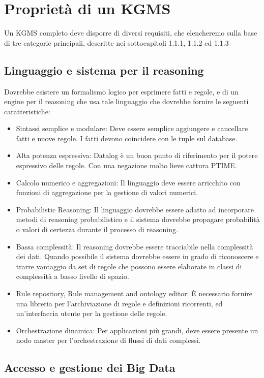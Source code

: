 \section{Proprietà di un KGMS}

Un KGMS completo deve disporre di diversi requisiti, che elencheremo sulla base di tre categorie principali, descritte nei sottocapitoli 1.1.1, 1.1.2 ed 1.1.3

\subsection{Linguaggio e sistema per il reasoning}

Dovrebbe esistere un formalismo logico per esprimere fatti e regole, e di un engine per il reasoning che usa tale linguaggio che dovrebbe fornire le seguenti caratteristiche:
\begin{itemize}
	\item Sintassi semplice e modulare: Deve essere semplice aggiungere e cancellare fatti e nuove regole. I fatti devono coincidere con le tuple sul database.
	\item Alta potenza espressiva: Datalog è un buon punto di riferimento per il potere espressivo delle regole. Con una negazione molto lieve cattura PTIME.
	\item Calcolo numerico e aggregazioni: Il linguaggio deve essere arricchito con funzioni di aggregazione per la gestione di valori numerici.
	\item Probabilistic Reasoning: Il linguaggio dovrebbe essere adatto ad incorporare metodi di reasoning probabilistico e il sistema dovrebbe propagare probabilità o valori di certezza durante il processo di reasoning.
	\item Bassa complessità: Il reasoning dovrebbe essere tracciabile nella complessità dei dati. Quando possibile il sistema dovrebbe essere in grado di riconoscere e trarre vantaggio da set di regole che possono essere elaborate in classi di complessità a basso livello di spazio. 
	\item Rule repository, Rule management and ontology editor: È necessario fornire una libreria per l'archiviazione di regole e definizioni ricorrenti, ed un'interfaccia utente per la gestione delle regole.
	\item Orchestrazione dinamica: Per applicazioni più grandi, deve essere presente un nodo master per l'orchestrazione di flussi di dati complessi.
\end{itemize}

\subsection{Accesso e gestione dei Big Data}

